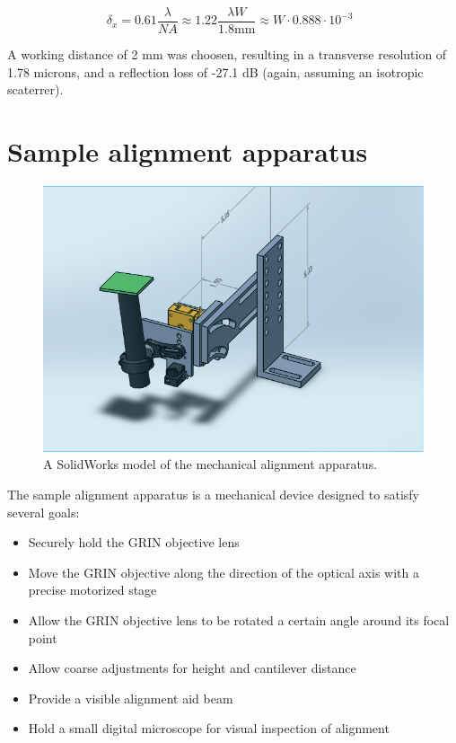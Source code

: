 \begin{equation} \label{eq:tres2}
\delta_x = 0.61 \frac{\lambda}{NA} \approx 1.22 \frac{\lambda W}{1.8 \mathrm{mm}} \approx W \cdot 0.888 \cdot 10^{-3} \;\;
\end{equation}

A working distance of 2 mm was choosen, resulting in a transverse resolution of 1.78 microns, and a reflection loss of -27.1 dB (again, assuming an isotropic scaterrer).

\section{Sample alignment apparatus}


\begin{figure}[h!]
\centering
\includegraphics[width=1.0\textwidth]{Images/Alignment/new_d_2.png}
\caption{A SolidWorks model of the mechanical alignment apparatus.}
\end{figure}

The sample alignment apparatus is a mechanical device designed to satisfy several goals:

\begin{itemize}
	\item Securely hold the GRIN objective lens
	\item Move the GRIN objective along the direction of the optical axis with a precise motorized stage
	\item Allow the GRIN objective lens to be rotated a certain angle around its focal point
	\item Allow coarse adjustments for height and cantilever distance
	\item Provide a visible alignment aid beam
	\item Hold a small digital microscope for visual inspection of alignment
\end{itemize}

